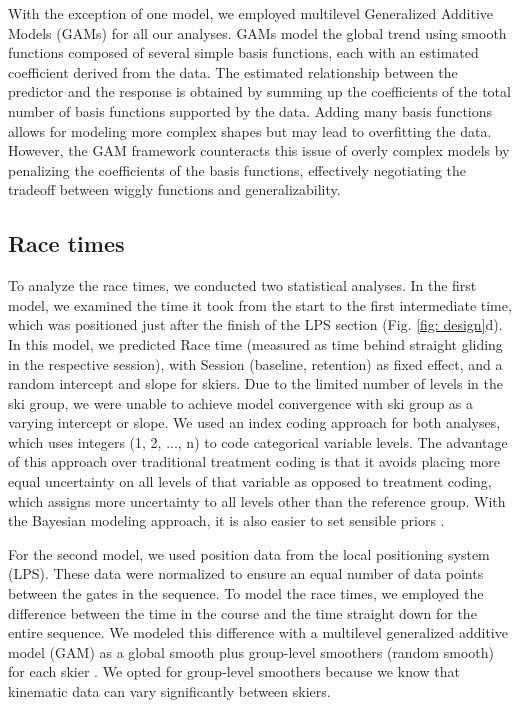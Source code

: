 \documentclass{article}
\begin{document}
With the exception of one model, we employed multilevel Generalized Additive Models (GAMs) for all our analyses. GAMs model the global trend using smooth functions composed of several simple basis functions, each with an estimated coefficient derived from the data. The estimated relationship between the predictor and the response is obtained by summing up the coefficients of the total number of basis functions supported by the data. Adding many basis functions allows for modeling more complex shapes but may lead to overfitting the data. However, the GAM framework counteracts this issue of overly complex models by penalizing the coefficients of the basis functions, effectively negotiating the tradeoff between wiggly functions and generalizability.


\subsection{Race times}
To analyze the race times, we conducted two statistical analyses. In the first model, we examined the time it took from the start to the first intermediate time, which was positioned just after the finish of the LPS section (Fig. \ref{fig: design}d). In this model, we predicted Race time (measured as time behind straight gliding in the respective session), with Session (baseline, retention) as fixed effect, and a random intercept and slope for skiers. Due to the limited number of levels in the ski group, we were unable to achieve model convergence with ski group as a varying intercept or slope. We used an index coding approach for both analyses, which uses integers (1, 2, ..., n) to code categorical variable levels. The advantage of this approach over traditional treatment coding is that it avoids placing more equal uncertainty on all levels of that variable as opposed to treatment coding, which assigns more uncertainty to all levels other than the reference group. With the Bayesian modeling approach, it is also easier to set sensible priors \cite{mcelreath_statistical_2018}. 

For the second model, we used position data from the local positioning system (LPS). These data were normalized to ensure an equal number of data points between the gates in the sequence. To model the race times, we employed the difference between the time in the course and the time straight down for the entire sequence. We modeled this difference with a multilevel generalized additive model (GAM) as a global smooth plus group-level smoothers (random smooth) for each skier \cite{pedersen_hierarchical_2019}. We opted for group-level smoothers because we know that kinematic data can vary significantly between skiers.
\end{document}
